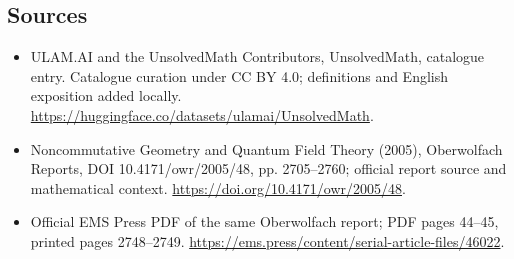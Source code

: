 \documentclass[11pt]{article}
\begin{document}
\subsection{Sources}
\begin{itemize}
\item[\hypertarget{source:statement:1}{S1}] ULAM.AI and the UnsolvedMath Contributors, UnsolvedMath, catalogue entry. Catalogue curation under CC BY 4.0; definitions and English exposition added locally.
\url{https://huggingface.co/datasets/ulamai/UnsolvedMath}.
\item[\hypertarget{source:statement:2}{S2}] Noncommutative Geometry and Quantum Field Theory (2005), Oberwolfach Reports, DOI 10.4171/owr/2005/48, pp. 2705--2760; official report source and mathematical context.
\url{https://doi.org/10.4171/owr/2005/48}.
\item[\hypertarget{source:statement:3}{S3}] Official EMS Press PDF of the same Oberwolfach report; PDF pages 44--45, printed pages 2748--2749.
\url{https://ems.press/content/serial-article-files/46022}.
\end{itemize}
\label{end:statement}
\end{document}
